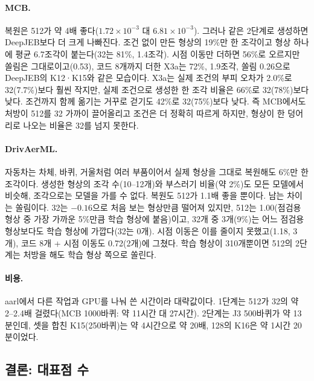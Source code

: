 \documentclass[11pt]{article}
\begin{document}
\paragraph{MCB.} 복원은 512가 약 4배 좋다($1.72\times10^{-3}$ 대 $6.81\times10^{-3}$). 그러나 같은 2단계로 생성하면 DeepJEB보다 더 크게 나빠진다.
조건 없이 만든 형상의 19\%만 한 조각이고 형상 하나에 평균 6.7조각이 붙는다(32는 81\%, 1.4조각). 시점 이동만 더하면 56\%로 오르지만 쏠림은 그대로이고(0.53),
코드 8개까지 더한 X3a는 72\%, 1.9조각, 쏠림 0.26으로 DeepJEB의 K12·K15와 같은 모습이다. X3a는 실제 조건의 부피 오차가 2.0\%로 32(7.7\%)보다 훨씬 작지만,
실제 조건으로 생성한 한 조각 비율은 66\%로 32(78\%)보다 낮다. 조건까지 함께 옮기는 거꾸로 걷기도 42\%로 32(75\%)보다 낮다.
즉 MCB에서도 처방이 512를 32 가까이 끌어올리고 조건은 더 정확히 따르게 하지만, 형상이 한 덩어리로 나오는 비율은 32를 넘지 못한다.

\paragraph{DrivAerML.} 자동차는 차체, 바퀴, 거울처럼 여러 부품이어서 실제 형상을 그대로 복원해도 6\%만 한 조각이다.
생성한 형상의 조각 수(10--12개)와 부스러기 비율(약 2\%)도 모든 모델에서 비슷해, 조각으로는 모델을 가를 수 없다. 복원도 512가 1.1배 좋을 뿐이다.
남는 차이는 쏠림이다. 32는 $-0.16$으로 처음 보는 형상만큼 떨어져 있지만, 512는 1.00(점검용 형상 중 가장 가까운 5\%만큼 학습 형상에 붙음)이고,
32개 중 3개(9\%)는 어느 점검용 형상보다도 학습 형상에 가깝다(32는 0개). 시점 이동은 이를 줄이지 못했고(1.18, 3개),
코드 8개 + 시점 이동도 0.72(2개)에 그쳤다. 학습 형상이 310개뿐이면 512의 2단계는 처방을 해도 학습 형상 쪽으로 쏠린다.

\paragraph{비용.} aarl에서 다른 작업과 GPU를 나눠 쓴 시간이라 대략값이다. 1단계는 512가 32의 약 2--2.4배 걸렸다(MCB 1000바퀴: 약 11시간 대 27시간).
2단계는 J3 500바퀴가 약 13분인데, 셋을 합친 K15(250바퀴)는 약 4시간으로 약 20배, 128의 K16은 약 1시간 20분이었다.

\subsection{결론: 대표점 수}
\label{sec:tsizeconclusion}
\end{document}
